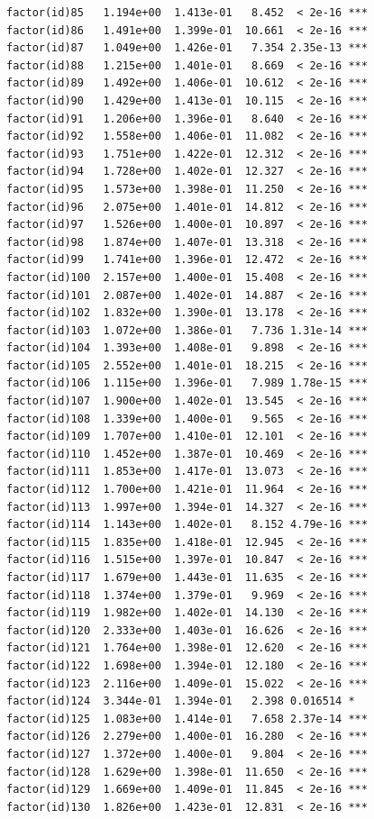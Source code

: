 \documentclass[]{book}
\begin{document}
\begin{verbatim}
factor(id)85   1.194e+00  1.413e-01   8.452  < 2e-16 ***
factor(id)86   1.491e+00  1.399e-01  10.661  < 2e-16 ***
factor(id)87   1.049e+00  1.426e-01   7.354 2.35e-13 ***
factor(id)88   1.215e+00  1.401e-01   8.669  < 2e-16 ***
factor(id)89   1.492e+00  1.406e-01  10.612  < 2e-16 ***
factor(id)90   1.429e+00  1.413e-01  10.115  < 2e-16 ***
factor(id)91   1.206e+00  1.396e-01   8.640  < 2e-16 ***
factor(id)92   1.558e+00  1.406e-01  11.082  < 2e-16 ***
factor(id)93   1.751e+00  1.422e-01  12.312  < 2e-16 ***
factor(id)94   1.728e+00  1.402e-01  12.327  < 2e-16 ***
factor(id)95   1.573e+00  1.398e-01  11.250  < 2e-16 ***
factor(id)96   2.075e+00  1.401e-01  14.812  < 2e-16 ***
factor(id)97   1.526e+00  1.400e-01  10.897  < 2e-16 ***
factor(id)98   1.874e+00  1.407e-01  13.318  < 2e-16 ***
factor(id)99   1.741e+00  1.396e-01  12.472  < 2e-16 ***
factor(id)100  2.157e+00  1.400e-01  15.408  < 2e-16 ***
factor(id)101  2.087e+00  1.402e-01  14.887  < 2e-16 ***
factor(id)102  1.832e+00  1.390e-01  13.178  < 2e-16 ***
factor(id)103  1.072e+00  1.386e-01   7.736 1.31e-14 ***
factor(id)104  1.393e+00  1.408e-01   9.898  < 2e-16 ***
factor(id)105  2.552e+00  1.401e-01  18.215  < 2e-16 ***
factor(id)106  1.115e+00  1.396e-01   7.989 1.78e-15 ***
factor(id)107  1.900e+00  1.402e-01  13.545  < 2e-16 ***
factor(id)108  1.339e+00  1.400e-01   9.565  < 2e-16 ***
factor(id)109  1.707e+00  1.410e-01  12.101  < 2e-16 ***
factor(id)110  1.452e+00  1.387e-01  10.469  < 2e-16 ***
factor(id)111  1.853e+00  1.417e-01  13.073  < 2e-16 ***
factor(id)112  1.700e+00  1.421e-01  11.964  < 2e-16 ***
factor(id)113  1.997e+00  1.394e-01  14.327  < 2e-16 ***
factor(id)114  1.143e+00  1.402e-01   8.152 4.79e-16 ***
factor(id)115  1.835e+00  1.418e-01  12.945  < 2e-16 ***
factor(id)116  1.515e+00  1.397e-01  10.847  < 2e-16 ***
factor(id)117  1.679e+00  1.443e-01  11.635  < 2e-16 ***
factor(id)118  1.374e+00  1.379e-01   9.969  < 2e-16 ***
factor(id)119  1.982e+00  1.402e-01  14.130  < 2e-16 ***
factor(id)120  2.333e+00  1.403e-01  16.626  < 2e-16 ***
factor(id)121  1.764e+00  1.398e-01  12.620  < 2e-16 ***
factor(id)122  1.698e+00  1.394e-01  12.180  < 2e-16 ***
factor(id)123  2.116e+00  1.409e-01  15.022  < 2e-16 ***
factor(id)124  3.344e-01  1.394e-01   2.398 0.016514 *  
factor(id)125  1.083e+00  1.414e-01   7.658 2.37e-14 ***
factor(id)126  2.279e+00  1.400e-01  16.280  < 2e-16 ***
factor(id)127  1.372e+00  1.400e-01   9.804  < 2e-16 ***
factor(id)128  1.629e+00  1.398e-01  11.650  < 2e-16 ***
factor(id)129  1.669e+00  1.409e-01  11.845  < 2e-16 ***
factor(id)130  1.826e+00  1.423e-01  12.831  < 2e-16 ***

\end{verbatim}
\end{document}
